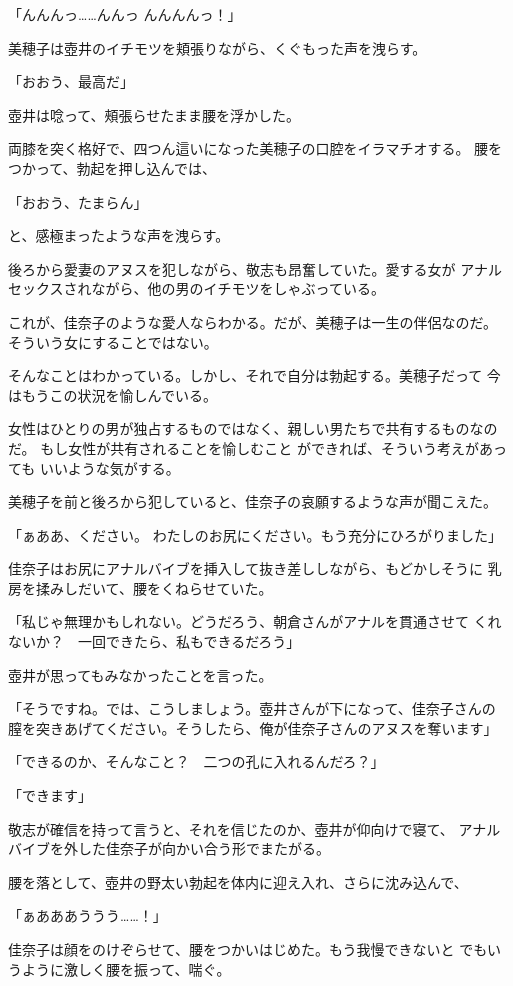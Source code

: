 ﻿\documentclass[
    book,tate,
    line_length=30zw,
    jafontsize=12pt,
    paper=b5j,
    landscape,
    ]{jlreq}
\begin{document}
「んんんっ……んんっ んんんんっ！」

美穂子は壺井のイチモツを頬張りながら、くぐもった声を洩らす。

「おおう、最高だ」

壺井は唸って、頰張らせたまま腰を浮かした。

両膝を突く格好で、四つん這いになった美穂子の口腔をイラマチオする。
腰をつかって、勃起を押し込んでは、

「おおう、たまらん」

と、感極まったような声を洩らす。

後ろから愛妻のアヌスを犯しながら、敬志も昂奮していた。愛する女が
アナルセックスされながら、他の男のイチモツをしゃぶっている。

これが、佳奈子のような愛人ならわかる。だが、美穂子は一生の伴侶なのだ。
そういう女にすることではない。

そんなことはわかっている。しかし、それで自分は勃起する。美穂子だって
今はもうこの状況を愉しんでいる。

女性はひとりの男が独占するものではなく、親しい男たちで共有するものなのだ。
もし女性が共有されることを愉しむこと ができれば、そういう考えがあっても
いいような気がする。

美穂子を前と後ろから犯していると、佳奈子の哀願するような声が聞こえた。

「ぁああ、ください。 わたしのお尻にください。もう充分にひろがりました」

佳奈子はお尻にアナルバイブを挿入して抜き差ししながら、もどかしそうに
乳房を揉みしだいて、腰をくねらせていた。

「私じゃ無理かもしれない。どうだろう、朝倉さんがアナルを貫通させて
くれないか？　一回できたら、私もできるだろう」

壺井が思ってもみなかったことを言った。

「そうですね。では、こうしましょう。壺井さんが下になって、佳奈子さんの
膣を突きあげてください。そうしたら、俺が佳奈子さんのアヌスを奪います」

「できるのか、そんなこと？　二つの孔に入れるんだろ？」

「できます」

敬志が確信を持って言うと、それを信じたのか、壺井が仰向けで寝て、
アナルバイブを外した佳奈子が向かい合う形でまたがる。

腰を落として、壺井の野太い勃起を体内に迎え入れ、さらに沈み込んで、

「ぁあああううう……！」

佳奈子は顔をのけぞらせて、腰をつかいはじめた。もう我慢できないと
でもいうように激しく腰を振って、喘ぐ。
\end{document}
